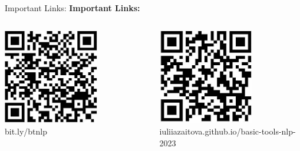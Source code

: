 \documentclass[aspectratio=169]{beamer}
\begin{document}



\begin{frame}{Important Links:}
\textbf{Important Links:}
\begin{columns}[T]
\begin{column}{0.5\textwidth}
\centering
\includegraphics[width=0.65\textwidth]{Images/qr_code_piazza.jpg} \\
bit.ly/btnlp
\end{column}

\begin{column}{0.5\textwidth}
\centering
\includegraphics[width=0.65\textwidth]{Images/qr_code_website.jpg} \\
iuliiazaitova.github.io/basic-tools-nlp-2023
\end{column}
\end{columns}
\end{frame}
\end{document}
